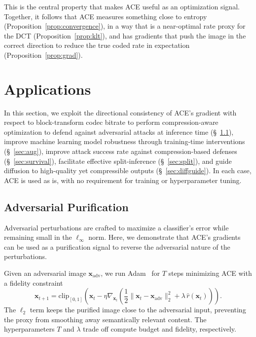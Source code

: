 \documentclass{article}
\theoremstyle{definition}
\newcommand{\bx}{\boldsymbol{x}}
\begin{document}
This is the central property that makes ACE useful as an optimization signal.
Together, it follows that ACE measures something close to entropy (Proposition~\ref{prop:convergence}), in a way that is a near-optimal rate proxy for the DCT (Proposition~\ref{prop:klt}), and has gradients that push the image in the correct direction to reduce the true coded rate in expectation (Proposition~\ref{prop:grad}).

\section{Applications}
\label{sec:applications}

In this section, we exploit the directional consistency of ACE's gradient with respect to block-transform codec bitrate to perform compression-aware optimization to defend against adversarial attacks at inference time (\S~\ref{sec:adv_pur}), improve machine learning model robustness through training-time interventions (\S~\ref{sec:aug}), improve attack success rate against compression-based defenses (\S~\ref{sec:survival}), facilitate effective split-inference (\S~\ref{sec:split}), and guide diffusion to high-quality yet compressible outputs (\S~\ref{sec:diffguide}).
In each case, ACE is used as is, with no requirement for training or hyperparameter tuning.

\subsection{Adversarial Purification}\label{sec:adv_pur}

Adversarial perturbations are crafted to maximize a classifier's error while remaining small in the $\ell_\infty$ norm.
Here, we demonstrate that ACE's gradients can be used as a purification signal to reverse the adversarial nature of the perturbations.

Given an adversarial image $\bx_\mathrm{adv}$, we run Adam~\citep{kingma2014adam} for $T$ steps minimizing ACE with a fidelity constraint
\begin{equation}
  \bx_{t+1} = \mathrm{clip}_{[0,1]}\!\left(
    \bx_t - \eta\nabla_{\bx_t}
    \left(\frac{1}{2}\|\bx_t - \bx_\mathrm{adv}\|_2^2
          + \lambda\,\hat{r}(\bx_t)\right)
  \right).
  \label{eq:purify}
\end{equation}
The $\ell_2$ term keeps the purified image close to the adversarial input, preventing the proxy from smoothing away semantically relevant content.
The hyperparameters $T$ and $\lambda$ trade off compute budget and fidelity, respectively.
\end{document}
